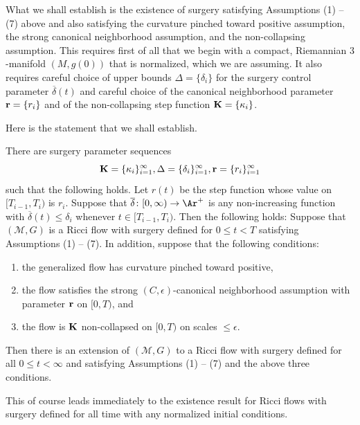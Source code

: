 What we shall establish is the existence of surgery satisfying Assumptions (1) -- (7)
above and also satisfying the curvature pinched toward positive assumption, the
strong canonical neighborhood assumption, and the non-collapsing assumption.
This requires first of all that we begin with a compact, Riemannian
$3$-manifold $(M,g(0))$ that is normalized, which we are assuming. It also
requires careful choice of upper bounds $\Delta=\{\delta_i\}$ for the surgery
control parameter $\overline\delta(t)$ and careful choice of the canonical neighborhood
parameter ${\bf r}=\{r_i\}$ and of the non-collapsing step function ${\bf
K}=\{\kappa_i\}$.

Here is the statement that we shall establish.


\begin{theorem}
\label{thm:main-existence-ricci-flow-surgery}\label{MAIN}
There are surgery parameter sequences
$${\bf
K}=\{\kappa_i\}_{i=1}^\infty,\Delta=\{\delta_i\}_{i=1}^\infty,{\bf
r}=\{r_i\}_{i=1}^\infty$$
  such that the following holds. Let $r(t)$
be the step function whose value on $[T_{i-1},T_i)$ is $r_i$.
Suppose that $\overline\delta\colon [0,\infty)\to \Ar^+$ is any
non-increasing function with $\overline\delta(t)\le \delta_i$
whenever $t\in [T_{i-1},T_i)$. Then the following holds: Suppose
that $({\mathcal M},G)$ is a Ricci flow with surgery defined for
$0\le t<T$ satisfying Assumptions (1) -- (7). In addition, suppose that
the following conditions:
\begin{enumerate}
\item[(1)] the generalized flow has curvature
pinched toward positive,
\item[(2)] the flow satisfies the strong $(C,\epsilon)$-canonical neighborhood assumption
with parameter ${\bf r}$ on $[0,T)$, and \item[(3)] the flow is ${\bf K}$
non-collapsed on $[0,T)$ on scales $\le \epsilon$.
\end{enumerate}
 Then there is
an extension of $({\mathcal M},G)$ to a Ricci flow with surgery
defined for all $0\le t<\infty$ and satisfying Assumptions (1) -- (7) and
the above three conditions.
\end{theorem}

This of course leads immediately to the existence result for Ricci
flows with surgery defined for all time with any normalized initial
conditions.


